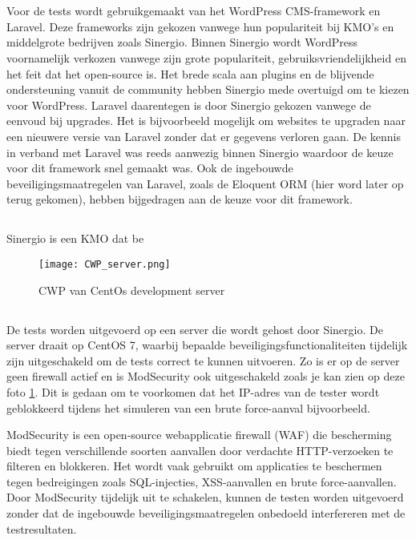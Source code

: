 \section{}
Voor de tests wordt gebruikgemaakt van het WordPress CMS-framework en Laravel. Deze frameworks zijn gekozen vanwege hun 
populariteit bij KMO's en middelgrote bedrijven zoals Sinergio. Binnen Sinergio wordt WordPress voornamelijk verkozen vanwege 
zijn grote populariteit, gebruiksvriendelijkheid en het feit dat het open-source is. Het brede scala aan plugins en de 
blijvende ondersteuning vanuit de community hebben Sinergio mede overtuigd om te kiezen voor WordPress. 
Laravel daarentegen is door Sinergio gekozen vanwege de eenvoud bij upgrades. Het is bijvoorbeeld mogelijk om websites 
te upgraden naar een nieuwere versie van Laravel zonder dat er gegevens verloren gaan. De kennis in verband met Laravel was 
reeds aanwezig binnen Sinergio waardoor de keuze voor dit framework snel gemaakt was. Ook de ingebouwde beveiligingsmaatregelen 
van Laravel, zoals de Eloquent ORM (hier word later op terug gekomen), hebben bijgedragen aan de keuze voor dit framework.

\subsection{}
Sinergio is een KMO dat be

\begin{figure}
    \centering
    \texttt{[image: CWP\_server.png]}
    \caption[CWP van CentOs development server]{CWP van CentOs development server}
    \label{fig:centos_server}
\end{figure}
\subsection{}
De tests worden uitgevoerd op een server die wordt gehost door Sinergio. De server draait op CentOS 7, waarbij bepaalde 
beveiligingsfunctionaliteiten tijdelijk zijn uitgeschakeld om de tests correct te kunnen uitvoeren. Zo is er op de server 
geen firewall actief en is ModSecurity ook uitgeschakeld zoals je kan zien op deze foto \ref{fig:centos_server}. Dit is gedaan om te voorkomen dat het IP-adres van de tester wordt 
geblokkeerd tijdens het simuleren van een brute force-aanval bijvoorbeeld.

ModSecurity is een open-source webapplicatie firewall (WAF) die bescherming biedt tegen verschillende soorten aanvallen door 
verdachte HTTP-verzoeken te filteren en blokkeren. Het wordt vaak gebruikt om applicaties te beschermen tegen bedreigingen 
zoals SQL-injecties, XSS-aanvallen en brute force-aanvallen. Door ModSecurity tijdelijk uit te schakelen, kunnen de testen 
worden uitgevoerd zonder dat de ingebouwde beveiligingsmaatregelen onbedoeld interfereren met de testresultaten.


